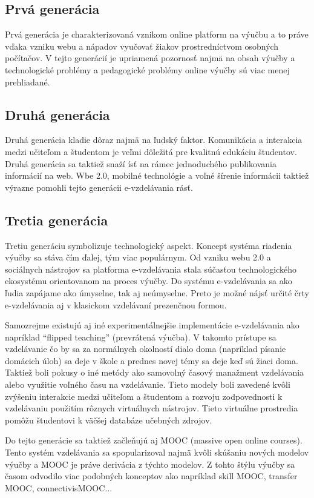 \documentclass[10pt,slovak,a4paper]{article}
\begin{document}
	\subsection{Prvá generácia}
	Prvá generácia je charakterizovaná vznikom online platform na výučbu a to práve vďaka vzniku webu a nápadov vyučovať žiakov prostredníctvom osobných počítačov. V tejto generácií je upriamená pozornosť najmä na obsah výučby a technologické problémy a pedagogické problémy online výučby sú viac menej prehliadané.
	\cite{main}

	\subsection{Druhá generácia}
	Druhá generácia kladie dôraz najmä na ľudský faktor. Komunikácia a interakcia medzi učiteľom a študentom je veľmi dôležitá pre kvalitnú edukáciu študentov. Druhá generácia sa taktiež snaží ísť na rámec jednoduchého publikovania informácií na web. Wbe 2.0, mobilné technológie a voľné šírenie informácii taktiež výrazne pomohli tejto generácii e-vzdelávania rásť.
	\cite{main}
	
	\subsection{Tretia generácia}
	Tretiu generáciu symbolizuje technologický aspekt. Koncept systéma riadenia výučby sa stáva čím ďalej, tým viac populárnym. Od vzniku webu 2.0 a sociálnych nástrojov sa platforma e-vzdelávania stala súčasťou technologického ekosystému orientovanom na proces výučby. Do systému e-vzdelávania sa ako ľudia zapájame ako úmyselne, tak aj neúmyselne. Preto je možné nájsť určité črty e-vzdelávania aj v klasickom vzdelávaní prezenčnou formou.
	\cite{main}

	Samozrejme existujú aj iné experimentálnejšie implementácie e-vzdelávania ako napríklad “flipped teaching” (prevrátená výučba). V takomto prístupe sa vzdelávanie čo by sa za normálnych okolností dialo doma (napríklad písanie domácich úloh) sa deje v škole a prednes novej témy sa deje keď sú žiaci doma. Taktiež boli pokusy o iné metódy ako samovolný časový manažment vzdelávania alebo využitie voľného času na vzdelávanie. Tieto modely boli zavedené kvôli zvýšeniu interakcie medzi učiteľom a študentom a rozvoju zodpovednosti k vzdelávaniu použitím rôznych virtuálnych nástrojov. Tieto virtuálne prostredia pomôžu študentovi k väčšej databáze učebných zdrojov.

	Do tejto generácie sa taktiež začleňujú aj MOOC (massive open online courses). Tento systém vzdelávania sa spopularizoval najmä kvôli skúšaniu nových modelov výučby a MOOC je práve derivácia z týchto modelov. Z tohto štýlu výučby sa časom odvodilo viac podobných konceptov ako napríklad skill MOOC, transfer MOOC, connectivisMOOC...
\end{document}
